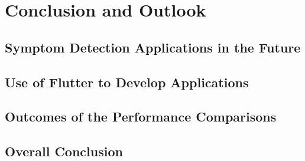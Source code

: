 

\chapter{Conclusion and Outlook}
\section{Symptom Detection Applications in the Future}
\section{Use of Flutter to Develop Applications}
\section{Outcomes of the Performance Comparisons}
\section{Overall Conclusion}

